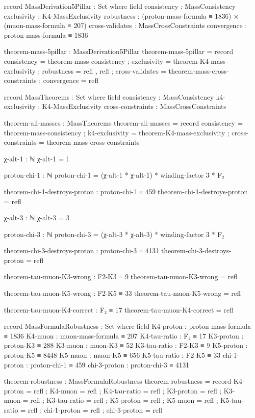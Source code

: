 \documentclass[11pt,a4paper]{book}
\begin{document}
\begin{code}
record MassDerivation5Pillar : Set where
  field
    consistency     : MassConsistency
    exclusivity     : K4-MassExclusivity
    robustness      : (proton-mass-formula ≡ 1836) × (muon-mass-formula ≡ 207)
    cross-validates : MassCrossConstraints
    convergence     : proton-mass-formula ≡ 1836

theorem-mass-5pillar : MassDerivation5Pillar
theorem-mass-5pillar = record
  { consistency     = theorem-mass-consistency
  ; exclusivity     = theorem-K4-mass-exclusivity
  ; robustness      = refl , refl
  ; cross-validates = theorem-mass-cross-constraints
  ; convergence     = refl
  }

record MassTheorems : Set where
  field
    consistency       : MassConsistency
    k4-exclusivity    : K4-MassExclusivity
    cross-constraints : MassCrossConstraints

theorem-all-masses : MassTheorems
theorem-all-masses = record
  { consistency       = theorem-mass-consistency
  ; k4-exclusivity    = theorem-K4-mass-exclusivity
  ; cross-constraints = theorem-mass-cross-constraints
  }

χ-alt-1 : ℕ
χ-alt-1 = 1

proton-chi-1 : ℕ
proton-chi-1 = (χ-alt-1 * χ-alt-1) * winding-factor 3 * F₂

theorem-chi-1-destroys-proton : proton-chi-1 ≡ 459
theorem-chi-1-destroys-proton = refl

χ-alt-3 : ℕ
χ-alt-3 = 3

proton-chi-3 : ℕ
proton-chi-3 = (χ-alt-3 * χ-alt-3) * winding-factor 3 * F₂

theorem-chi-3-destroys-proton : proton-chi-3 ≡ 4131
theorem-chi-3-destroys-proton = refl

theorem-tau-muon-K3-wrong : F2-K3 ≡ 9
theorem-tau-muon-K3-wrong = refl

theorem-tau-muon-K5-wrong : F2-K5 ≡ 33
theorem-tau-muon-K5-wrong = refl

theorem-tau-muon-K4-correct : F₂ ≡ 17
theorem-tau-muon-K4-correct = refl

record MassFormulaRobustness : Set where
  field
    K4-proton     : proton-mass-formula ≡ 1836
    K4-muon       : muon-mass-formula ≡ 207
    K4-tau-ratio  : F₂ ≡ 17
    K3-proton     : proton-K3 ≡ 288
    K3-muon       : muon-K3 ≡ 52
    K3-tau-ratio  : F2-K3 ≡ 9
    K5-proton     : proton-K5 ≡ 8448
    K5-muon       : muon-K5 ≡ 656
    K5-tau-ratio  : F2-K5 ≡ 33
    chi-1-proton  : proton-chi-1 ≡ 459
    chi-3-proton  : proton-chi-3 ≡ 4131

theorem-robustness : MassFormulaRobustness
theorem-robustness = record
  { K4-proton     = refl
  ; K4-muon       = refl
  ; K4-tau-ratio  = refl
  ; K3-proton     = refl
  ; K3-muon       = refl
  ; K3-tau-ratio  = refl
  ; K5-proton     = refl
  ; K5-muon       = refl
  ; K5-tau-ratio  = refl
  ; chi-1-proton  = refl
  ; chi-3-proton  = refl
  }
\end{code}
\end{document}
